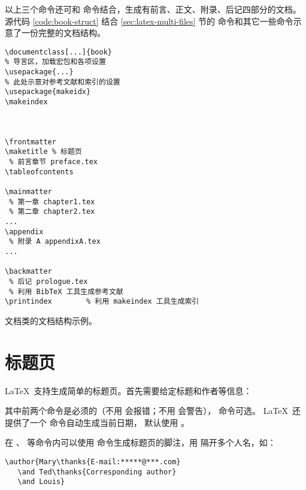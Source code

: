 以上三个命令还可和  命令结合，生成有前言、正文、附录、后记四部分的文档。
源代码 \ref{code:book-struct} 结合 \ref{sec:latex-multi-files} 节的  命令和其它一些命令示意了一份完整的文档结构。

\begin{sourcecode}[hbp]
\begin{Verbatim}
\documentclass[...]{book}
% 导言区，加载宏包和各项设置
\usepackage{...}
% 此处示意对参考文献和索引的设置
\usepackage{makeidx}
\makeindex



\frontmatter
\maketitle % 标题页
 % 前言章节 preface.tex 
\tableofcontents

\mainmatter
 % 第一章 chapter1.tex
 % 第二章 chapter2.tex
...
\appendix
 % 附录 A appendixA.tex
...

\backmatter
 % 后记 prologue.tex
 % 利用 BibTeX 工具生成参考文献
\printindex        % 利用 makeindex 工具生成索引

\end{Verbatim}
\caption{ 文档类的文档结构示例。}\label{code:book-struct}
\end{sourcecode}

\section{标题页}\label{sec:titlepage}

\LaTeX\ 支持生成简单的标题页。首先需要给定标题和作者等信息：
\begin{command}
 \quad
{} \quad
{}
\end{command}
其中前两个命令是必须的（不用  会报错；不用  会警告）， 命令可选。
\LaTeX\ 还提供了一个  命令自动生成当前日期， 默认使用  。

在 、 等命令内可以使用  命令生成标题页的脚注，用  隔开多个人名，如：
\begin{verbatim}
\author{Mary\thanks{E-mail:*****@***.com}
   \and Ted\thanks{Corresponding author}
   \and Louis}
\end{verbatim}

